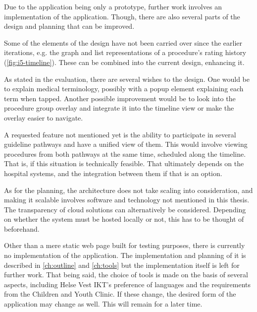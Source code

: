 Due to the application being only a prototype, further work involves an implementation of the application. Though, there are also several parts of the design and planning that can be improved.

Some of the elements of the design have not been carried over since the earlier iterations, e.g. the graph and list representations of a procedure's rating history (\autoref{fig:i5-timeline}). These can be combined into the current design, enhancing it.

As stated in the evaluation, there are several wishes to the design. One would be to explain medical terminology, possibly with a popup element explaining each term when tapped. Another possible improvement would be to look into the procedure group overlay and integrate it into the timeline view or make the overlay easier to navigate.

A requested feature not mentioned yet is the ability to participate in several guideline pathways and have a unified view of them. This would involve viewing procedures from both pathways at the same time, scheduled along the timeline. That is, if this situation is technically feasible. That ultimately depends on the hospital systems, and the integration between them if that is an option.

As for the planning, the architecture does not take scaling into consideration, and making it scalable involves software and technology not mentioned in this thesis. The transparency of cloud solutions can alternatively be considered. Depending on whether the system must be hosted locally or not, this has to be thought of beforehand.

Other than a mere static web page built for testing purposes, there is currently no implementation of the application. The implementation and planning of it is described in \autoref{ch:outline} and \autoref{ch:tools} but the implementation itself is left for further work. That being said, the choice of tools is made on the basis of several aspects, including Helse Vest IKT's preference of languages and the requirements from the Children and Youth Clinic. If these change, the desired form of the application may change as well. This will remain for a later time.
